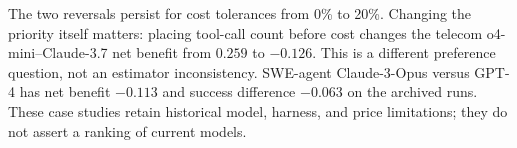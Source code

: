 The two reversals persist for cost tolerances from 0\% to 20\%. Changing
the priority itself matters: placing tool-call count before cost changes
the telecom o4-mini--Claude-3.7 net benefit from $0.259$ to $-0.126$.
This is a different preference question, not an estimator inconsistency.
SWE-agent Claude-3-Opus versus GPT-4 has net benefit $-0.113$ and success
difference $-0.063$ on the archived runs. These case studies retain
historical model, harness, and price limitations; they do not assert a
ranking of current models.
